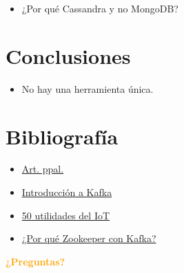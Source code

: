 \documentclass[dvipsnames]{beamer}
\begin{document}
        \begin{frame}
          \begin{itemize}
          \item ¿Por qué Cassandra y no MongoDB?
          \end{itemize}
        \end{frame}
        
        \section{Conclusiones}

        \begin{frame}
          \begin{itemize}
          \item No hay una herramienta única.
          \end{itemize}
        \end{frame}

        	
	\section{Bibliografía}
	
	\begin{frame}
		\begin{itemize}
		\item \href{https://www.infoq.com/articles/traffic-data-monitoring-iot-kafka-and-spark-streaming}{Art. ppal.}
                \item \href{http://kafka.apache.org/intro}{Introducción a Kafka}
                \item \href{http://www.libelium.com/resources/top_50_iot_sensor_applications_ranking/}{50 utilidades del IoT}
                \item \href{https://www.quora.com/What-is-the-actual-role-of-ZooKeeper-in-Kafka}{¿Por qué Zookeeper con Kafka?}
		\end{itemize}
	\end{frame}
	
	\begin{frame}[plain]
		\begin{center}
			\textcolor{orange}{\textbf{¿Preguntas?}}
		\end{center}
	\end{frame}
	
	
\end{document}
